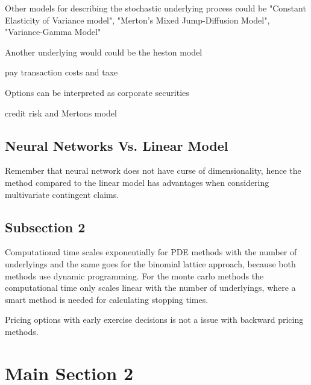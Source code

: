 Other models for describing the stochastic underlying process could be "Constant Elasticity of Variance model", "Merton's Mixed Jump-Diffusion Model", "Variance-Gamma Model"

Another underlying would could be the heston model

pay transaction costs and taxe

Options can be interpreted as corporate securities

credit risk and Mertons model


\subsection{Neural Networks Vs. Linear Model}
Remember that neural network does not have curse of dimensionality, hence the method compared to the linear model has advantages when considering multivariate contingent claims.


\subsection{Subsection 2}
Computational time scales exponentially for PDE methods with the number of underlyings and the same goes for the binomial lattice approach, because both methods use dynamic programming. For the monte carlo methods the computational time only scales linear with the number of underlyings, where a smart method is needed for calculating stopping times.

Pricing options with early exercise decisions is not a issue with backward pricing methods.


\section{Main Section 2}
\parencite{liaw2018tune}
